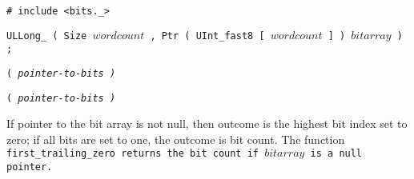 
\tt{# include <bits._>}

\tt{ULLong_} \s\tt{( Size} $wordcount$
\tt{, Ptr ( UInt_fast8 [} $wordcount$ \tt{] )} $bitarray$ \tt{) ;}

\s\tt{(}
\it{pointer-to-bits} \tt{)}

\s\s\tt{(}
\it{pointer-to-bits} \tt{)}


If pointer to the bit array is not null, then outcome is the highest bit
index set to zero; if all bits are set to one, the outcome is bit count.
The function \tt{first_trailing_zero} returns
the bit count if $bitarray$ is a null pointer.
